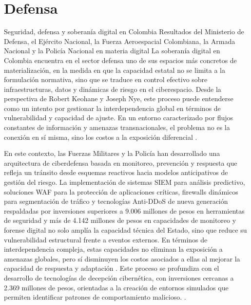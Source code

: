 \section{Defensa}

 Seguridad, defensa y soberanía digital en Colombia
Resultados del Ministerio de Defensa, el Ejército Nacional, la Fuerza Aeroespacial Colombiana, la Armada Nacional y la Policía Nacional en materia digital 
La soberanía digital en Colombia encuentra en el sector defensa uno de sus espacios más concretos de materialización, en la medida en que la capacidad estatal no se limita a la formulación normativa, sino que se traduce en control efectivo sobre infraestructuras, datos y dinámicas de riesgo en el ciberespacio. Desde la perspectiva de Robert Keohane y Joseph Nye, este proceso puede entenderse como un intento por gestionar la interdependencia global en términos de vulnerabilidad y capacidad de ajuste. En un entorno caracterizado por flujos constantes de información y amenazas transnacionales, el problema no es la conexión en sí misma, sino los costos a la exposición diferencial \parencite{keohane_nye_power_2011,mintic_seguridad_digital_2025}.

En este contexto, las Fuerzas Militares y la Policía han desarrollado una arquitectura de ciberdefensa basada en monitoreo, prevención y respuesta que refleja un tránsito desde esquemas reactivos hacia modelos anticipativos de gestión del riesgo. La implementación de sistemas SIEM para análisis predictivo, soluciones WAF para la protección de aplicaciones críticas, firewalls dinámicos para segmentación de tráfico y tecnologías Anti-DDoS de nueva generación respaldadas por inversiones superiores a 9.006 millones de pesos en herramientas de seguridad y más de 4.142 millones de pesos en capacidades de monitoreo y forense digital no solo amplía la capacidad técnica del Estado, sino que reduce su vulnerabilidad estructural frente a eventos externos. En términos de interdependencia compleja, estas capacidades no eliminan la exposición a amenazas globales, pero sí disminuyen los costos asociados a ellas al mejorar la capacidad de respuesta y adaptación \parencite{mindefensa_audiencia_rendicion_2025,cogfm_informe_ejecutivo_2025}.
Este proceso se profundiza con el desarrollo de tecnologías de decepción cibernética, con inversiones cercanas a 2.369 millones de pesos, orientadas a la creación de entornos simulados que permiten identificar patrones de comportamiento malicioso.  \parencite{mindefensa_audiencia_rendicion_2025}.

